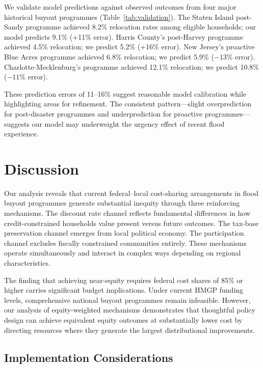 \documentclass[11pt,letterpaper]{article}
\theoremstyle{definition}
\begin{document}
We validate model predictions against observed outcomes from four major historical buyout programmes (Table~\ref{tab:validation}). The Staten Island post-Sandy programme achieved 8.2\% relocation rates among eligible households; our model predicts 9.1\% (+11\% error). Harris County's post-Harvey programme achieved 4.5\% relocation; we predict 5.2\% (+16\% error). New Jersey's proactive Blue Acres programme achieved 6.8\% relocation; we predict 5.9\% ($-13$\% error). Charlotte-Mecklenburg's programme achieved 12.1\% relocation; we predict 10.8\% ($-11$\% error).

These prediction errors of 11--16\% suggest reasonable model calibration while highlighting areas for refinement. The consistent pattern---slight overprediction for post-disaster programmes and underprediction for proactive programmes---suggests our model may underweight the urgency effect of recent flood experience.

\section{Discussion}

Our analysis reveals that current federal--local cost-sharing arrangements in flood buyout programmes generate substantial inequity through three reinforcing mechanisms. The discount rate channel reflects fundamental differences in how credit-constrained households value present versus future outcomes. The tax-base preservation channel emerges from local political economy. The participation channel excludes fiscally constrained communities entirely. These mechanisms operate simultaneously and interact in complex ways depending on regional characteristics.

The finding that achieving near-equity requires federal cost shares of 85\% or higher carries significant budget implications. Under current HMGP funding levels, comprehensive national buyout programmes remain infeasible. However, our analysis of equity-weighted mechanisms demonstrates that thoughtful policy design can achieve equivalent equity outcomes at substantially lower cost by directing resources where they generate the largest distributional improvements.

\subsection{Implementation Considerations}
\end{document}
